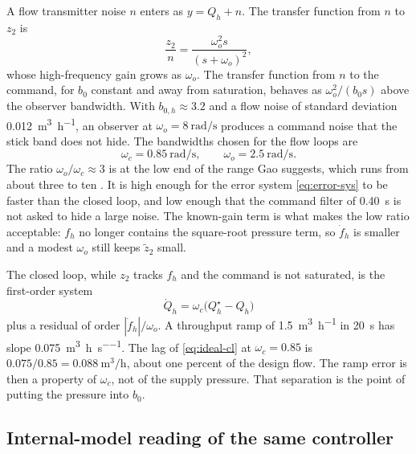 A flow transmitter noise $n$ enters as $y = Q_h+n$. The transfer function from $n$ to $z_2$ is
\begin{equation}
\label{eq:noise-z2}
\frac{z_2}{n} = \frac{\omega_o^2 s}{(s+\omega_o)^2},
\end{equation}
whose high-frequency gain grows as $\omega_o$. The transfer function from $n$ to the command, for $b_0$ constant and away from saturation, behaves as $\omega_o^2/(b_0 s)$ above the observer bandwidth. With $b_{0,h}\approx 3.2$ and a flow noise of standard deviation \SI{0.012}{\cubic\metre\per\hour}, an observer at $\omega_o = 8\ \si{\radian\per\second}$ produces a command noise that the stick band does not hide. The bandwidths chosen for the flow loops are
\begin{equation}
\label{eq:flow-bw}
\omega_c = 0.85\ \si{\radian\per\second}, \qquad \omega_o = 2.5\ \si{\radian\per\second}.
\end{equation}
The ratio $\omega_o/\omega_c \approx 3$ is at the low end of the range Gao suggests, which runs from about three to ten \cite{gao2003scaling,herbst2013simulative}. It is high enough for the error system \eqref{eq:error-sys} to be faster than the closed loop, and low enough that the command filter of \SI{0.40}{s} is not asked to hide a large noise. The known-gain term is what makes the low ratio acceptable: $f_h$ no longer contains the square-root pressure term, so $\dot{f}_h$ is smaller and a modest $\omega_o$ still keeps $\tilde{z}_2$ small.

The closed loop, while $z_2$ tracks $f_h$ and the command is not saturated, is the first-order system
\begin{equation}
\label{eq:ideal-cl}
\dot{Q}_h = \omega_c \big(Q_h^\star - Q_h\big)
\end{equation}
plus a residual of order $|\dot{f}_h|/\omega_o$. A throughput ramp of \SI{1.5}{\cubic\metre\per\hour} in \SI{20}{s} has slope \SI{0.075}{\cubic\metre\per\hour\per\second}. The lag of \eqref{eq:ideal-cl} at $\omega_c=0.85$ is $0.075/0.85 = \SI{0.088}{\cubic\metre\per\hour}$, about one percent of the design flow. The ramp error is then a property of $\omega_c$, not of the supply pressure. That separation is the point of putting the pressure into $b_0$.

\subsection{Internal-model reading of the same controller}

